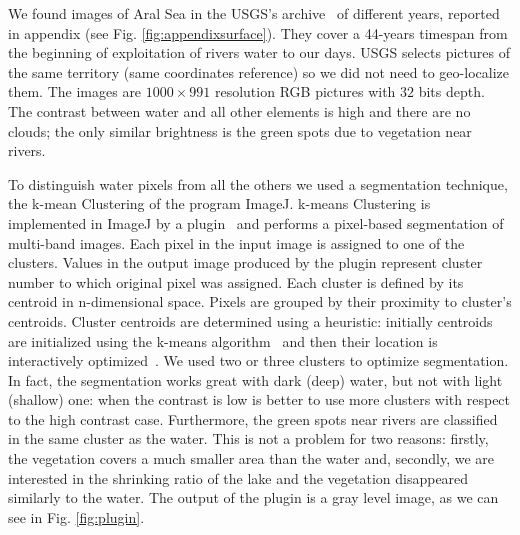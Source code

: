 We found images of Aral Sea in the USGS's archive~\cite{images} of different years, reported in appendix (see Fig. \ref{fig:appendixsurface}).
They cover a 44-years timespan from the beginning of exploitation of rivers water to our days. 
USGS selects pictures of the same territory (same coordinates reference) so we did not need to geo-localize them. 
The images are $1000 \times 991$ resolution RGB pictures with $32$ bits depth. 
The contrast between water and all other elements is high and there are no clouds; the only similar brightness is the green spots due to vegetation near rivers.

To distinguish water pixels from all the others we used a segmentation technique, the k-mean Clustering of the program ImageJ. 
k-means Clustering is implemented in ImageJ by a plugin~\cite{plugin} and performs a pixel-based segmentation of multi-band images. 
Each pixel in the input image is assigned to one of the clusters. 
Values in the output image produced by the plugin represent cluster number to which original pixel was assigned. 
Each cluster is defined by its centroid in n-dimensional space. 
Pixels are grouped by their proximity to cluster's centroids. 
Cluster centroids are determined using a heuristic: initially centroids are initialized using the k-means algorithm~\cite{kmeans} and then their location is interactively optimized~\cite{plugin}.
We used two or three clusters to optimize segmentation. 
In fact, the segmentation works great with dark (deep) water, but not with light (shallow) one: when the contrast is low is better to use more clusters with respect to the high contrast case. 
Furthermore, the green spots near rivers are classified in the same cluster as the water. 
This is not a problem for two reasons: firstly, the vegetation covers a much smaller area than the water and, secondly, we are interested in the shrinking ratio of the lake and the vegetation disappeared similarly to the water. 
The output of the plugin is a gray level image, as we can see in Fig. \ref{fig:plugin}.
